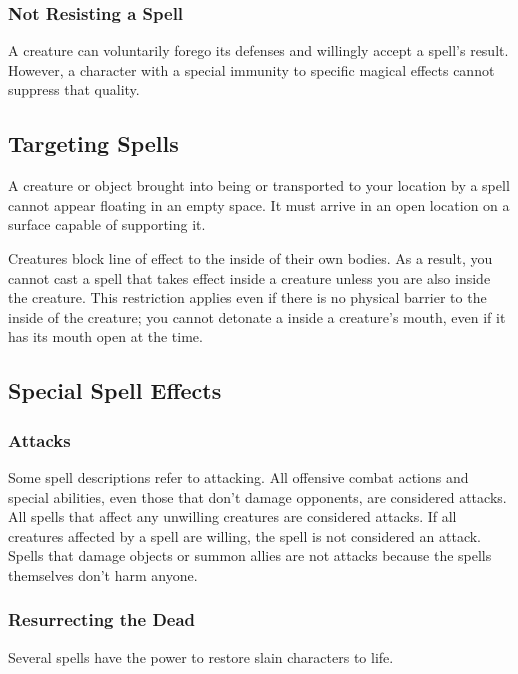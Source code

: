 \subsubsection{Not Resisting a Spell} A creature can voluntarily forego its defenses and willingly accept a spell's result. However, a character with a special immunity to specific magical effects cannot suppress that quality.

\subsection{Targeting Spells}

 A creature or object brought into being or transported to your location by a spell cannot appear floating in an empty space. It must arrive in an open location on a surface capable of supporting it.

 Creatures block line of effect to the inside of their own bodies. As a result, you cannot cast a spell that takes effect inside a creature unless you are also inside the creature. This restriction applies even if there is no physical barrier to the inside of the creature; you cannot detonate a  inside a creature's mouth, even if it has its mouth open at the time.

\subsection{Special Spell Effects}

\subsubsection{Attacks}
Some spell descriptions refer to attacking. All offensive combat actions and special abilities, even those that don't damage opponents, are considered attacks. All spells that affect any unwilling creatures are considered attacks. If all creatures affected by a spell are willing, the spell is not considered an attack. Spells that damage objects or summon allies are not attacks because the spells themselves don't harm anyone.

\subsubsection{Resurrecting the Dead}\label{Resurrecting the Dead}

Several spells have the power to restore slain characters to life.

